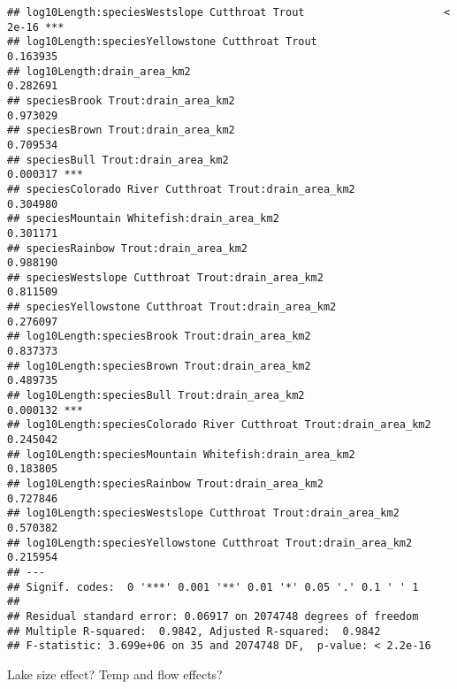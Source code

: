 \documentclass[
  landscape]{article}
\begin{document}
\begin{verbatim}
## log10Length:speciesWestslope Cutthroat Trout                      < 2e-16 ***
## log10Length:speciesYellowstone Cutthroat Trout                   0.163935    
## log10Length:drain_area_km2                                       0.282691    
## speciesBrook Trout:drain_area_km2                                0.973029    
## speciesBrown Trout:drain_area_km2                                0.709534    
## speciesBull Trout:drain_area_km2                                 0.000317 ***
## speciesColorado River Cutthroat Trout:drain_area_km2             0.304980    
## speciesMountain Whitefish:drain_area_km2                         0.301171    
## speciesRainbow Trout:drain_area_km2                              0.988190    
## speciesWestslope Cutthroat Trout:drain_area_km2                  0.811509    
## speciesYellowstone Cutthroat Trout:drain_area_km2                0.276097    
## log10Length:speciesBrook Trout:drain_area_km2                    0.837373    
## log10Length:speciesBrown Trout:drain_area_km2                    0.489735    
## log10Length:speciesBull Trout:drain_area_km2                     0.000132 ***
## log10Length:speciesColorado River Cutthroat Trout:drain_area_km2 0.245042    
## log10Length:speciesMountain Whitefish:drain_area_km2             0.183805    
## log10Length:speciesRainbow Trout:drain_area_km2                  0.727846    
## log10Length:speciesWestslope Cutthroat Trout:drain_area_km2      0.570382    
## log10Length:speciesYellowstone Cutthroat Trout:drain_area_km2    0.215954    
## ---
## Signif. codes:  0 '***' 0.001 '**' 0.01 '*' 0.05 '.' 0.1 ' ' 1
## 
## Residual standard error: 0.06917 on 2074748 degrees of freedom
## Multiple R-squared:  0.9842, Adjusted R-squared:  0.9842 
## F-statistic: 3.699e+06 on 35 and 2074748 DF,  p-value: < 2.2e-16
\end{verbatim}

Lake size effect? Temp and flow effects?
\end{document}
